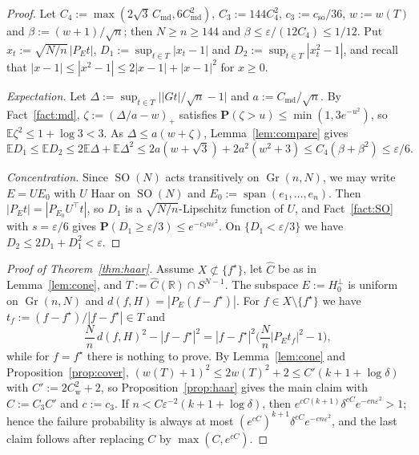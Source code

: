 \documentclass[11pt]{article}
\newcommand{\R}{\mathbb{R}}
\newcommand{\E}{\mathbb{E}}
\newcommand{\Prob}{\mathbf{P}}
\newcommand{\eps}{\varepsilon}
\newcommand{\fs}{f^{\star}}
\newcommand{\Ch}{\widehat{C}}
\DeclareMathOperator{\Gr}{Gr}
\DeclareMathOperator{\SO}{SO}
\DeclareMathOperator{\spn}{span}
\newcommand{\Cmd}{C_{\mathrm{md}}}
\newcommand{\Cw}{C_{\mathrm{w}}}
\newcommand{\cso}{c_{\mathrm{so}}}
\begin{document}
\begin{proof}
Let $C_4:=\max(2\sqrt3\,\Cmd,6\Cmd^2)$, $C_3:=144C_4^2$, $c_3:=\cso/36$, $w:=w(T)$ and $\beta:=(w+1)/\sqrt n$; then $N\ge n\ge144$ and $\beta\le\eps/(12C_4)\le1/12$. Put $x_t:=\sqrt{N/n}\,|P_Et|$, $D_1:=\sup_{t\in T}|x_t-1|$ and $D_2:=\sup_{t\in T}|x_t^2-1|$, and recall that $|x-1|\le|x^2-1|\le2|x-1|+|x-1|^2$ for $x\ge0$.

\emph{Expectation.} Let $\Delta:=\sup_{t\in T}\big||Gt|/\sqrt n-1\big|$ and $a:=\Cmd/\sqrt n$. By Fact~\ref{fact:md}, $\zeta:=(\Delta/a-w)_+$ satisfies $\Prob(\zeta>u)\le\min(1,3e^{-u^2})$, so $\E\zeta^2\le1+\log3<3$. As $\Delta\le a(w+\zeta)$, Lemma~\ref{lem:compare} gives
\[
\E D_1\le\E D_2\le2\E\Delta+\E\Delta^2\le2a(w+\sqrt3)+2a^2(w^2+3)\le C_4(\beta+\beta^2)\le\eps/6.
\]

\emph{Concentration.} Since $\SO(N)$ acts transitively on $\Gr(n,N)$, we may write $E=UE_0$ with $U$ Haar on $\SO(N)$ and $E_0:=\spn(e_1,\dots,e_n)$. Then $|P_Et|=|P_{E_0}U^\top t|$, so $D_1$ is a $\sqrt{N/n}$-Lipschitz function of $U$, and Fact~\ref{fact:SO} with $s=\eps/6$ gives $\Prob(D_1\ge\eps/3)\le e^{-c_3n\eps^2}$. On $\{D_1<\eps/3\}$ we have $D_2\le2D_1+D_1^2<\eps$.
\end{proof}

\begin{proof}[Proof of Theorem~\ref{thm:haar}]
Assume $X\not\subset\{\fs\}$, let $\Ch$ be as in Lemma~\ref{lem:cone}, and $T:=\Ch(\R)\cap S^{N-1}$. The subspace $E:=H_0^\perp$ is uniform on $\Gr(n,N)$ and $d(f,H)=|P_E(f-\fs)|$. For $f\in X\setminus\{\fs\}$ we have $t_f:=(f-\fs)/|f-\fs|\in T$ and
\[
\frac Nn\,d(f,H)^2-|f-\fs|^2=|f-\fs|^2\Big(\frac Nn|P_Et_f|^2-1\Big),
\]
while for $f=\fs$ there is nothing to prove. By Lemma~\ref{lem:cone} and Proposition~\ref{prop:cover}, $(w(T)+1)^2\le2w(T)^2+2\le C'(k+1+\log\delta)$ with $C':=2\Cw^2+2$, so Proposition~\ref{prop:haar} gives the main claim with $C:=C_3C'$ and $c:=c_3$. If $n<C\eps^{-2}(k+1+\log\delta)$, then $e^{cC(k+1)}\delta^{cC}e^{-cn\eps^2}>1$; hence the failure probability is always at most $(e^{cC})^{k+1}\delta^{cC}e^{-cn\eps^2}$, and the last claim follows after replacing $C$ by $\max(C,e^{cC})$.
\end{proof}
\end{document}
